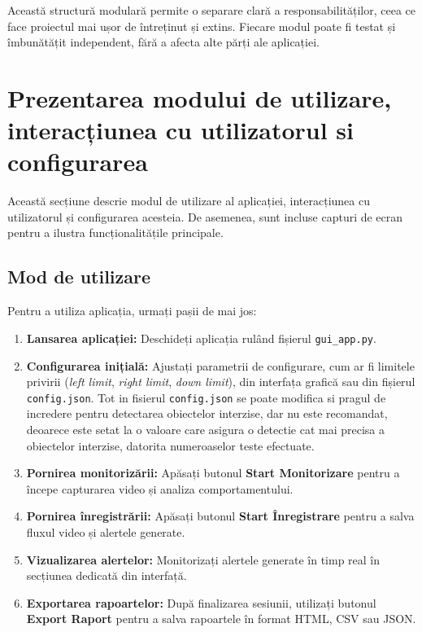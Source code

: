 \documentclass[12pt,a4paper]{article}
\begin{document}
\hspace{6mm}Această structură modulară permite o separare clară a responsabilităților, ceea ce face proiectul mai ușor de întreținut și extins. Fiecare modul poate fi testat și îmbunătățit independent, fără a afecta alte părți ale aplicației.

\section{Prezentarea modului de utilizare, interacțiunea cu utilizatorul si configurarea}

Această secțiune descrie modul de utilizare al aplicației, interacțiunea cu utilizatorul și configurarea acesteia. De asemenea, sunt incluse capturi de ecran pentru a ilustra funcționalitățile principale.

\subsection{Mod de utilizare}

Pentru a utiliza aplicația, urmați pașii de mai jos:
\begin{enumerate}
    \item \textbf{Lansarea aplicației:} Deschideți aplicația rulând fișierul \texttt{gui\_app.py}.
    \item \textbf{Configurarea inițială:} Ajustați parametrii de configurare, cum ar fi limitele privirii (\textit{left limit}, \textit{right limit}, \textit{down limit}), din interfața grafică sau din fișierul \texttt{config.json}. Tot in fisierul \texttt{config.json} se poate modifica si pragul de incredere pentru detectarea obiectelor interzise, dar nu este recomandat, deoarece este setat la o valoare care asigura o detectie cat mai precisa a obiectelor interzise, datorita numeroaselor teste efectuate.
    \item \textbf{Pornirea monitorizării:} Apăsați butonul \textbf{Start Monitorizare} pentru a începe capturarea video și analiza comportamentului.
    \item \textbf{Pornirea înregistrării:} Apăsați butonul \textbf{Start Înregistrare} pentru a salva fluxul video și alertele generate.
    \item \textbf{Vizualizarea alertelor:} Monitorizați alertele generate în timp real în secțiunea dedicată din interfață.
    \item \textbf{Exportarea rapoartelor:} După finalizarea sesiunii, utilizați butonul \textbf{Export Raport} pentru a salva rapoartele în format HTML, CSV sau JSON.
\end{enumerate}
\end{document}
